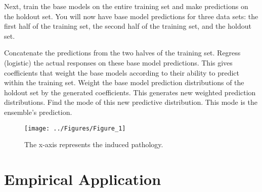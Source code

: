 \documentclass[12pt,titlepage]{mktg-article}
\begin{document}
Next, train the base models on the entire training set and make predictions on the holdout set. You will now have base model predictions for three data sets: the first half of the training set, the second half of the training set, and the holdout set.

Concatenate the predictions from the two halves of the training set. Regress (logistic) the actual responses on these base model predictions. This gives coefficients that weight the base models according to their ability to predict within the training set. Weight the base model prediction distributions of the holdout set by the generated coefficients. This generates new weighted prediction distributions. Find the mode of this new predictive distribution. This mode is the ensemble's prediction.

\begin{figure}

{\centering \texttt{[image: ../Figures/Figure\_1]} 

}

\caption{The x-axis represents the induced pathology.}\label{fig:ensemble-relative}
\end{figure}

\hypertarget{empirical-application}{%
\section{Empirical Application}\label{empirical-application}}

\pagebreak


\end{document}
